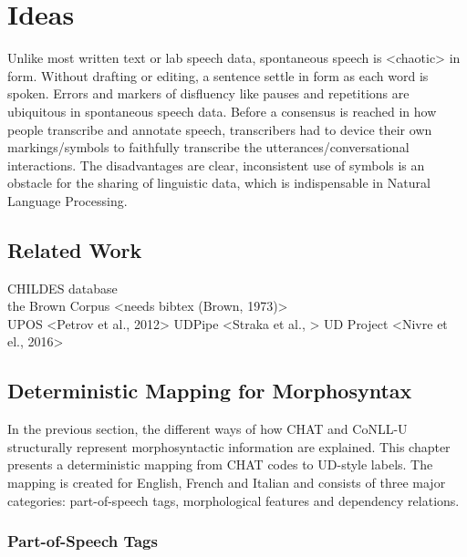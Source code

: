 \chapter{Ideas} %

\label{Chapter7} %

Unlike most written text or lab speech data, spontaneous speech is <chaotic> in form. Without drafting or editing, a sentence settle in form as each word is spoken. Errors and markers of disfluency like pauses and repetitions are ubiquitous in spontaneous speech data. Before a consensus is reached in how people transcribe and annotate speech, transcribers had to device their own markings/symbols to faithfully transcribe the utterances/conversational interactions. The disadvantages are clear, inconsistent use of symbols is an obstacle for the sharing of linguistic data, which is indispensable in Natural Language Processing.\\


\section{Related Work}

CHILDES database \cite{Macwhinney2000}\\
the Brown Corpus <needs bibtex (Brown, 1973)>\\
UPOS <Petrov et al., 2012>
UDPipe <Straka et al., >
UD Project <Nivre et el., 2016>

\section{Deterministic Mapping for Morphosyntax} %
\label{sec:mappings}
In the previous section, the different ways of how CHAT and CoNLL-U structurally represent morphosyntactic information are explained. This chapter presents a deterministic mapping from CHAT codes to UD-style labels. The mapping is created for English, French and Italian and consists of three major categories: part-of-speech tags, morphological features and dependency relations.


\subsection{Part-of-Speech Tags}

